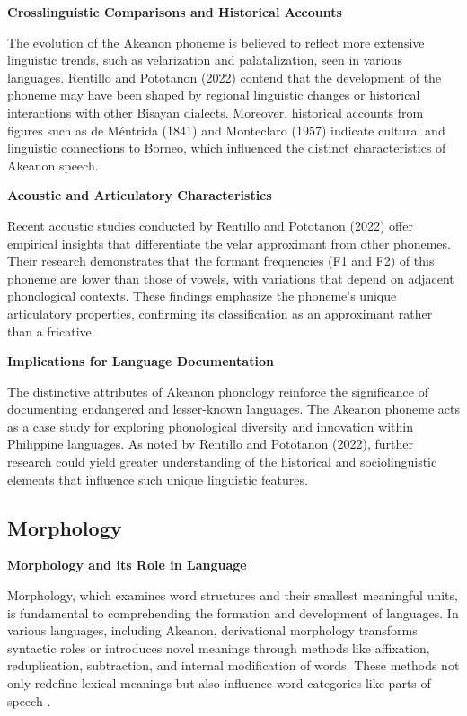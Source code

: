 \textbf{Crosslinguistic Comparisons and Historical Accounts}
  
The evolution of the Akeanon phoneme is believed to reflect more extensive linguistic trends, such as velarization and palatalization, seen in various languages. Rentillo and Pototanon (2022) contend that the development of the phoneme may have been shaped by regional linguistic changes or historical interactions with other Bisayan dialects. Moreover, historical accounts from figures such as de Méntrida (1841) and Monteclaro (1957) indicate cultural and linguistic connections to Borneo, which influenced the distinct characteristics of Akeanon speech.

\textbf{Acoustic and Articulatory Characteristics}  

Recent acoustic studies conducted by Rentillo and Pototanon (2022) offer empirical insights that differentiate the velar approximant from other phonemes. Their research demonstrates that the formant frequencies (F1 and F2) of this phoneme are lower than those of vowels, with variations that depend on adjacent phonological contexts. These findings emphasize the phoneme's unique articulatory properties, confirming its classification as an approximant rather than a fricative.

\textbf{Implications for Language Documentation}  

The distinctive attributes of Akeanon phonology reinforce the significance of documenting endangered and lesser-known languages. The Akeanon phoneme acts as a case study for exploring phonological diversity and innovation within Philippine languages. As noted by Rentillo and Pototanon (2022), further research could yield greater understanding of the historical and sociolinguistic elements that influence such unique linguistic features.

\subsection{Morphology}

\textbf{Morphology and its Role in Language}

Morphology, which examines word structures and their smallest meaningful units, is fundamental to comprehending the formation and development of languages. In various languages, including Akeanon, derivational morphology transforms syntactic roles or introduces novel meanings through methods like affixation, reduplication, subtraction, and internal modification of words. These methods not only redefine lexical meanings but also influence word categories like parts of speech .

